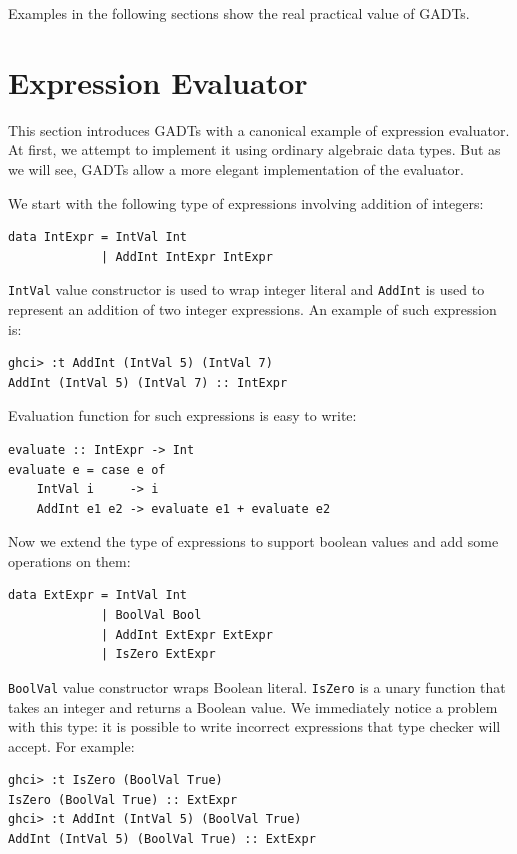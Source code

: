 \documentclass{tmr}
\begin{document}
Examples in the following sections show the real practical value of GADTs.

\section{Expression Evaluator}
\label{sec:expression_evaluator}

This section introduces GADTs with a canonical example of expression evaluator. At first, we attempt to implement it using ordinary algebraic data types. But as we will see, GADTs allow a more elegant implementation of the evaluator.

We start with the following type of expressions involving addition of integers:

\begin{Verbatim}
data IntExpr = IntVal Int
             | AddInt IntExpr IntExpr
\end{Verbatim}

\verb|IntVal| value constructor is used to wrap integer literal and \verb|AddInt| is used to represent an addition of two integer expressions. An example of such expression is:

\begin{Verbatim}
ghci> :t AddInt (IntVal 5) (IntVal 7)
AddInt (IntVal 5) (IntVal 7) :: IntExpr
\end{Verbatim}

Evaluation function for such expressions is easy to write:

\begin{Verbatim}
evaluate :: IntExpr -> Int
evaluate e = case e of
    IntVal i     -> i
    AddInt e1 e2 -> evaluate e1 + evaluate e2
\end{Verbatim}

Now we extend the type of expressions to support boolean values and add some operations on them:

\begin{Verbatim}
data ExtExpr = IntVal Int
             | BoolVal Bool
             | AddInt ExtExpr ExtExpr
             | IsZero ExtExpr
\end{Verbatim}

\verb|BoolVal| value constructor wraps Boolean literal. \verb|IsZero| is a unary function that takes an integer and returns a Boolean value. We immediately notice a problem with this type: it is possible to write incorrect expressions that type checker will accept. For example:

\begin{Verbatim}
ghci> :t IsZero (BoolVal True)
IsZero (BoolVal True) :: ExtExpr
ghci> :t AddInt (IntVal 5) (BoolVal True)
AddInt (IntVal 5) (BoolVal True) :: ExtExpr
\end{Verbatim}
\end{document}

